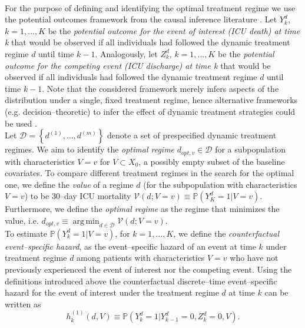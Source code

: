\documentclass[12pt]{article}
\DeclareMathOperator*{\argmin}{arg\,min}
\begin{document}
\\
\indent
For the purpose of defining and identifying the optimal treatment regime we use the potential outcomes framework from the causal inference literature \citep{Neyman1923, Rubin1978, Robins1986}. Let $Y^d_k$, $k=1,\dots,K$ be the \emph{potential outcome for the event of interest (ICU death) at time k} that would be observed if all individuals had followed the dynamic treatment regime $d$ until time $k-1$.  Analogously, let $Z^d_k$, $k=1,\dots,K$ be the \emph{potential outcome for the competing event (ICU discharge) at time k} that would be observed if all individuals had followed the dynamic treatment regime $d$ until time $k-1$. Note that the considered framework merely infers aspects of the distribution under a single, fixed treatment regime, hence alternative frameworks (e.g. decision--theoretic) to infer the effect of dynamic treatment strategies could be used \citep{Dawid2010}.  
\\
\indent
Let $\mathcal{D} = \left\lbrace d^{(1)}, \dots, d^{(m)} \right\rbrace$ denote a set of prespecified dynamic treatment regimes. We aim to identify the \emph{optimal regime} $d_{opt, v} \in \mathcal{D}$ for a subpopulation with characteristics $V=v$ for $V \subset X_0$, a possibly empty subset of the baseline covariates. To compare different treatment regimes in the search for the optimal one, we define the \emph{value} of a regime $d$ (for the subpopulation with characteristics $V=v$) to be $30$--day ICU mortality $\mathcal{V} \left(d; V=v \right) \equiv \mathbb{P} \left( Y^d_K = 1 \vert V = v \right)$. Furthermore, we define the \emph{optimal regime} as the regime that minimizes the value, i.e. $d_{opt, v} \equiv \argmin_{d \in \mathcal{D}} \mathcal{V} \left(d; V = v \right)$. 
\\
\indent
To estimate $\mathbb{P} \left( Y_{k}^d = 1 \vert V = v \right)$, for $k = 1, \dots, K$, we define the \emph{counterfactual event--specific hazard}, as the event--specific hazard of an event at time $k$ under treatment regime $d$ among patients with characteristics $V = v$ who have not previously experienced the event of interest nor the competing event. Using the definitions introduced above the counterfactual discrete--time event--specific hazard for the event of interest under the treatment regime $d$ at time $k$ can be written as 
\begin{equation}
\label{eqn1}
h_{k}^{(1)} \left(d, V \right) \equiv \mathbb{P} \left( Y_{k}^d = 1 \vert Y_{k-1}^d = 0, Z_{k}^d = 0, V \right).
\end{equation}
\end{document}
